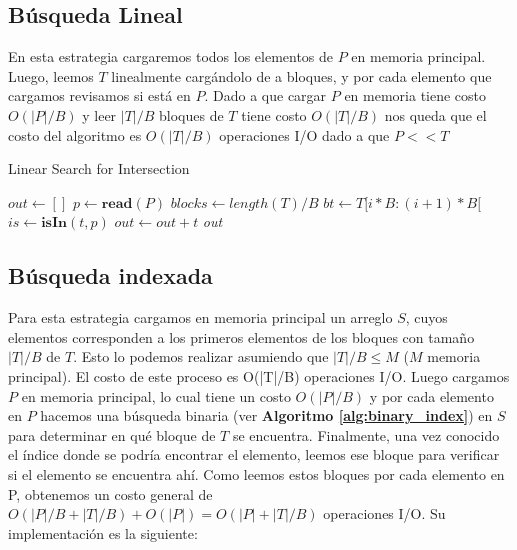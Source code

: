 \documentclass[11pt]{article}
\begin{document}
\subsection{Búsqueda Lineal} 
En esta estrategia cargaremos todos los elementos de $P$ en memoria principal. Luego, leemos $T$ linealmente cargándolo de a bloques, y por cada elemento que cargamos revisamos si está en $P$. Dado a que cargar $P$ en memoria tiene costo $O(|P|/B)$ y leer $|T|/B$ bloques de $T$ tiene costo $O(|T|/B)$ nos queda que el costo del algoritmo es $O(|T|/B)$ operaciones I/O dado a que $P<<T$

\begin{algorithm}
\caption{Linear Search for Intersection}
\label{alg:linear_search}
\begin{algorithmic}[1]
\State $\textit{out} \gets []$
\State $\textit{p} \gets \textbf{read}(P)$
\State $\textit{blocks} \gets length(T)/B$
\State $bt \gets {T[i*B : (i+1)*B[}$        
\State $is \gets \textbf{isIn}(t, p)$
    \State $out \gets out + t$
\EndIf
\EndFor
\EndFor
\State \Return \textit{out}
\EndProcedure
\end{algorithmic}
\end{algorithm}

\newpage

\subsection{Búsqueda indexada} 
Para esta estrategia cargamos en memoria principal un arreglo $S$, cuyos elementos corresponden a los primeros elementos de los bloques con tamaño $|T|/B$ de $T$. Esto lo podemos realizar asumiendo que $|T|/B \leq M$ ($M$ memoria principal). El costo de este proceso es O(|T|/B) operaciones I/O. Luego cargamos $P$ en memoria principal, lo cual tiene un costo $O(|P|/B)$ y por cada elemento en $P$ hacemos una búsqueda binaria (ver \textbf{Algoritmo \ref{alg:binary_index}}) en $S$ para determinar en qué bloque de $T$ se encuentra. 
\newline
Finalmente, una vez conocido el índice donde se podría encontrar el elemento, leemos ese bloque para verificar si el elemento se encuentra ahí. Como leemos estos bloques por cada elemento en P, obtenemos un costo general de $O(|P|/B + |T|/B) + O(|P|) = O(|P| + |T|/B)$ operaciones I/O. Su implementación es la siguiente:
\end{document}
